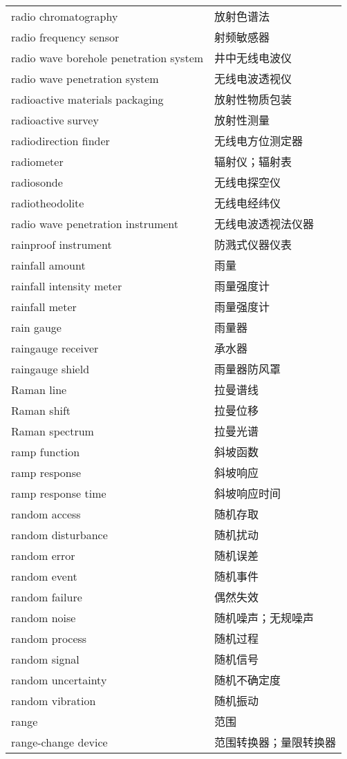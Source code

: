 \documentclass[
]{article}
\begin{document}
\begin{longtable}[]{@{}ll@{}}
radio chromatography & 放射色谱法 \\
radio frequency sensor & 射频敏感器 \\
radio wave borehole penetration system & 井中无线电波仪 \\
radio wave penetration system & 无线电波透视仪 \\
radioactive materials packaging & 放射性物质包装 \\
radioactive survey & 放射性测量 \\
radiodirection finder & 无线电方位测定器 \\
radiometer & 辐射仪；辐射表 \\
radiosonde & 无线电探空仪 \\
radiotheodolite & 无线电经纬仪 \\
radio wave penetration instrument & 无线电波透视法仪器 \\
rainproof instrument & 防溅式仪器仪表 \\
rainfall amount & 雨量 \\
rainfall intensity meter & 雨量强度计 \\
rainfall meter & 雨量强度计 \\
rain gauge & 雨量器 \\
raingauge receiver & 承水器 \\
raingauge shield & 雨量器防风罩 \\
Raman line & 拉曼谱线 \\
Raman shift & 拉曼位移 \\
Raman spectrum & 拉曼光谱 \\
ramp function & 斜坡函数 \\
ramp response & 斜坡响应 \\
ramp response time & 斜坡响应时间 \\
random access & 随机存取 \\
random disturbance & 随机扰动 \\
random error & 随机误差 \\
random event & 随机事件 \\
random failure & 偶然失效 \\
random noise & 随机噪声；无规噪声 \\
random process & 随机过程 \\
random signal & 随机信号 \\
random uncertainty & 随机不确定度 \\
random vibration & 随机振动 \\
range & 范围 \\
range-change device & 范围转换器；量限转换器 \\

\end{longtable}
\end{document}
